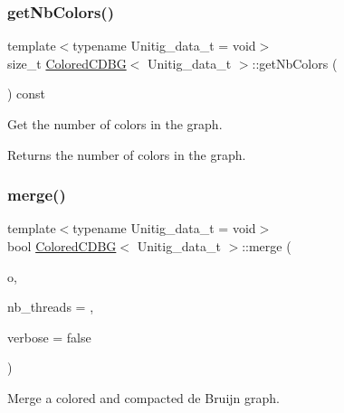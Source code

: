 \subsubsection{\texorpdfstring{get\+Nb\+Colors()}{getNbColors()}}
{\footnotesize\ttfamily template$<$typename Unitig\+\_\+data\+\_\+t = void$>$ \\
size\+\_\+t \hyperlink{classColoredCDBG}{Colored\+C\+D\+BG}$<$ Unitig\+\_\+data\+\_\+t $>$\+::get\+Nb\+Colors (\begin{DoxyParamCaption}{ }\end{DoxyParamCaption}) const\hspace{0.3cm}{\ttfamily [inline]}}



Get the number of colors in the graph. 

\begin{DoxyReturn}{Returns}
the number of colors in the graph. 
\end{DoxyReturn}
\mbox{\label{classColoredCDBG_a4242b53d2b0d7b28a038ad6d89b42db7}} 
\subsubsection{\texorpdfstring{merge()}{merge()}\hspace{0.1cm}{\footnotesize\ttfamily [1/4]}}
{\footnotesize\ttfamily template$<$typename Unitig\+\_\+data\+\_\+t = void$>$ \\
bool \hyperlink{classColoredCDBG}{Colored\+C\+D\+BG}$<$ Unitig\+\_\+data\+\_\+t $>$\+::merge (\begin{DoxyParamCaption}\item[{const \hyperlink{classColoredCDBG}{Colored\+C\+D\+BG}$<$ Unitig\+\_\+data\+\_\+t $>$ \&}]{o,  }\item[{const size\+\_\+t}]{nb\+\_\+threads = {},  }\item[{const bool}]{verbose = {\ttfamily false} }\end{DoxyParamCaption})}



Merge a colored and compacted de Bruijn graph. 

